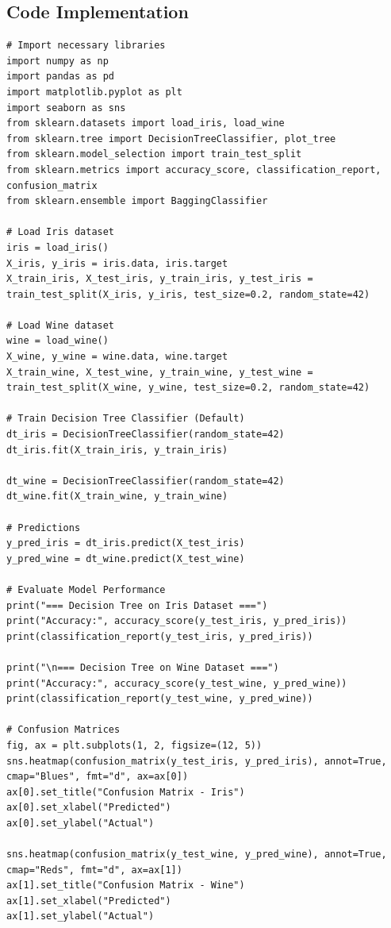 \documentclass[a4paper,12pt]{article}
\begin{document}
\subsection{Code Implementation}
\begin{lstlisting}[style=python]
    # Import necessary libraries
import numpy as np
import pandas as pd
import matplotlib.pyplot as plt
import seaborn as sns
from sklearn.datasets import load_iris, load_wine
from sklearn.tree import DecisionTreeClassifier, plot_tree
from sklearn.model_selection import train_test_split
from sklearn.metrics import accuracy_score, classification_report, confusion_matrix
from sklearn.ensemble import BaggingClassifier

# Load Iris dataset
iris = load_iris()
X_iris, y_iris = iris.data, iris.target
X_train_iris, X_test_iris, y_train_iris, y_test_iris = train_test_split(X_iris, y_iris, test_size=0.2, random_state=42)

# Load Wine dataset
wine = load_wine()
X_wine, y_wine = wine.data, wine.target
X_train_wine, X_test_wine, y_train_wine, y_test_wine = train_test_split(X_wine, y_wine, test_size=0.2, random_state=42)

# Train Decision Tree Classifier (Default)
dt_iris = DecisionTreeClassifier(random_state=42)
dt_iris.fit(X_train_iris, y_train_iris)

dt_wine = DecisionTreeClassifier(random_state=42)
dt_wine.fit(X_train_wine, y_train_wine)

# Predictions
y_pred_iris = dt_iris.predict(X_test_iris)
y_pred_wine = dt_wine.predict(X_test_wine)

# Evaluate Model Performance
print("=== Decision Tree on Iris Dataset ===")
print("Accuracy:", accuracy_score(y_test_iris, y_pred_iris))
print(classification_report(y_test_iris, y_pred_iris))

print("\n=== Decision Tree on Wine Dataset ===")
print("Accuracy:", accuracy_score(y_test_wine, y_pred_wine))
print(classification_report(y_test_wine, y_pred_wine))

# Confusion Matrices
fig, ax = plt.subplots(1, 2, figsize=(12, 5))
sns.heatmap(confusion_matrix(y_test_iris, y_pred_iris), annot=True, cmap="Blues", fmt="d", ax=ax[0])
ax[0].set_title("Confusion Matrix - Iris")
ax[0].set_xlabel("Predicted")
ax[0].set_ylabel("Actual")

sns.heatmap(confusion_matrix(y_test_wine, y_pred_wine), annot=True, cmap="Reds", fmt="d", ax=ax[1])
ax[1].set_title("Confusion Matrix - Wine")
ax[1].set_xlabel("Predicted")
ax[1].set_ylabel("Actual")


\end{lstlisting}
\end{document}
